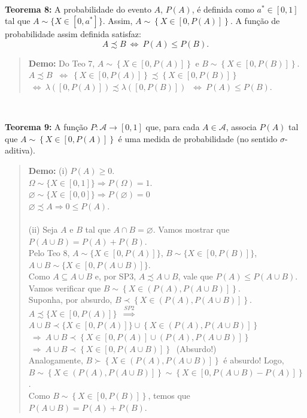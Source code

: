 \documentclass[
]{book}
\begin{document}
\(~\)

\textbf{Teorema 8:} A probabilidade do evento \(A\), \(P(A)\), é definida como \(a^* \in [0,1]\) tal que \(A \sim \{X \in [0,a^*]\}\). Assim, \(A \sim \left\{X \in \left[0,P(A)\right]\right\}\). A função de probabilidade assim definida satisfaz:
\[A \precsim B ~\Leftrightarrow~ P(A) \leq P(B).\]

\begin{quote}
\textbf{Demo:} Do Teo 7, \(A \sim \left\{X \in \left[0,P(A)\right]\right\}\) e \(B \sim \left\{X \in \left[0,P(B)\right]\right\}\).\\
\(A \precsim B\) \(~\Leftrightarrow~ \left\{X \in \left[0,P(A)\right]\right\} \precsim \left\{X \in \left[0,P(B)\right]\right\}\) \(~\Leftrightarrow~ \lambda \left([0,P(A)]\right) \precsim \lambda \left([0,P(B)]\right)\) \(~\Leftrightarrow~ P(A) \leq P(B).\)
\end{quote}

\(~\)

\textbf{Teorema 9:} A função \(P: \mathcal{A} \longrightarrow [0,1]\) que, para cada \(A \in \mathcal{A}\), associa \(P(A)\) tal que \(A \sim \left\{X \in \left[0,P(A)\right]\right\}\) é uma medida de probabilidade (no sentido \(\sigma\)-aditiva).

\begin{quote}
\textbf{Demo:}
(i) \(P(A) \geq 0\).\\
\(\Omega \sim \{X \in [0,1]\}\Rightarrow P(\Omega)=1\).\\
\(\varnothing \sim \{X \in [0,0]\} \Rightarrow P(\varnothing)=0\)\\
\(\varnothing \precsim A \Rightarrow 0 \leq P(A)\).\\
\(~\)\\
(ii) Seja \(A\) e \(B\) tal que \(A \cap B = \varnothing\). Vamos mostrar que \(P(A \cup B) = P(A) + P(B)\).\\
Pelo Teo 8, \(A \sim \{ X \in [0,P(A)]\}\), \(B \sim \{ X \in [0,P(B)]\}\), \(A \cup B \sim \{ X \in [0,P(A \cup B)]\}\).\\
Como \(A \subseteq A \cup B\) e, por SP3, \(A \precsim A \cup B\), vale que \(P(A) \leq P(A \cup B)\). Vamos verificar que \(B \sim \left\{X \in \left(P(A),P(A \cup B) \right]\right\}\).\\
Suponha, por absurdo, \(B \prec \left\{X \in \left(P(A),P(A \cup B) \right]\right\}\).\\
\(A \precsim \{X \in [0,P(A)]\}\) \(~\overset{SP2}{\Longrightarrow}~\)
\(A \cup B \prec \{X \in [0,P(A)]\} \cup \left\{X \in \left(P(A),P(A \cup B) \right]\right\}\)
\(~\Rightarrow~ A \cup B \prec \left\{X \in [0,P(A)] \cup \left(P(A),P(A \cup B) \right]\right\}\)
\(~\Rightarrow~ A \cup B \prec \left\{X \in \left[0,P(A \cup B) \right]\right\}~\) (Absurdo!)\\
Analogamente, \(B \succ \left\{X \in \left(P(A),P(A \cup B) \right]\right\}\) é absurdo! Logo, \(B \sim \left\{X \in \left(P(A),P(A \cup B) \right]\right\} \sim \left\{X \in \left[0, P(A \cup B)-P(A) \right]\right\}\).\\
Como \(B \sim \left\{X \in \left[0,P(B)\right]\right\}\), temos que \(P(A \cup B) = P(A) + P(B)\).
\end{quote}
\end{document}
